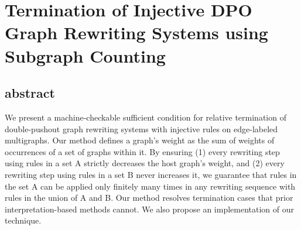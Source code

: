 \documentclass{book}
\begin{document}
 
% 


% 
% 
% 
% 
% 
% 
% 
% 
% 
% 







\chapter{Termination of Injective DPO Graph Rewriting
Systems using Subgraph Counting}

\section{abstract}
We present a machine-checkable sufficient condition for relative termination of double-pushout graph rewriting systems with injective rules on edge-labeled multigraphs. 
Our method defines a graph's weight as the sum of weights of occurrences of a set of graphs within it. By ensuring 
(1) every rewriting step using rules in a set A strictly decreases the host graph's weight, and 
(2) every rewriting step using rules in a set B never increases it, we guarantee that rules in the set A can be applied only finitely many times in any rewriting sequence with rules in the union of A and B.  
Our method resolves termination cases that prior interpretation-based methods cannot. 
We also propose an implementation of our technique.
\end{document}
